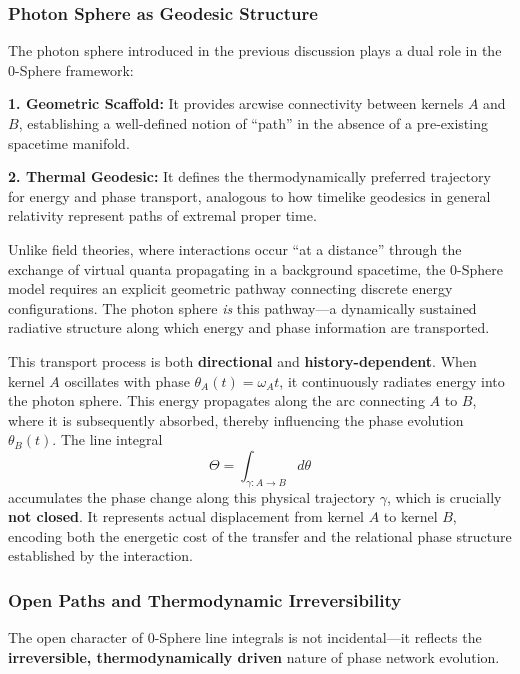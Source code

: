 \documentclass[12pt,letterpaper]{article}
\begin{document}
\subsubsection{Photon Sphere as Geodesic Structure}
\label{subsubsec:photon_sphere}

The photon sphere introduced in the previous discussion plays a dual role in the 0-Sphere framework:

\textbf{1. Geometric Scaffold:} It provides arcwise connectivity between kernels $A$ and $B$, establishing a well-defined notion of ``path'' in the absence of a pre-existing spacetime manifold.

\textbf{2. Thermal Geodesic:} It defines the thermodynamically preferred trajectory for energy and phase transport, analogous to how timelike geodesics in general relativity represent paths of extremal proper time.

Unlike field theories, where interactions occur ``at a distance'' through the exchange of virtual quanta propagating in a background spacetime, the 0-Sphere model requires an explicit geometric pathway connecting discrete energy configurations. The photon sphere \textit{is} this pathway—a dynamically sustained radiative structure along which energy and phase information are transported.

This transport process is both \textbf{directional} and \textbf{history-dependent}. When kernel $A$ oscillates with phase $\theta_A(t) = \omega_A t$, it continuously radiates energy into the photon sphere. This energy propagates along the arc connecting $A$ to $B$, where it is subsequently absorbed, thereby influencing the phase evolution $\theta_B(t)$. The line integral
\begin{equation}
\Theta = \int_{\gamma: A \to B} d\theta
\end{equation}
accumulates the phase change along this physical trajectory $\gamma$, which is crucially \textbf{not closed}. It represents actual displacement from kernel $A$ to kernel $B$, encoding both the energetic cost of the transfer and the relational phase structure established by the interaction.

\subsubsection{Open Paths and Thermodynamic Irreversibility}
\label{subsubsec:thermodynamic_irreversibility}

The open character of 0-Sphere line integrals is not incidental—it reflects the \textbf{irreversible, thermodynamically driven} nature of phase network evolution.
\end{document}

